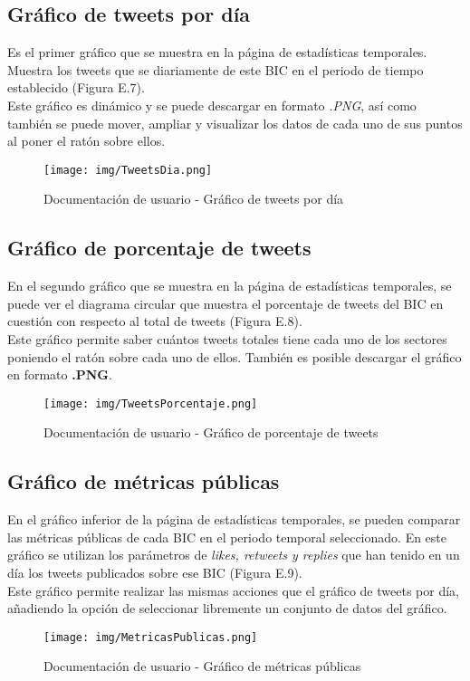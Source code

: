 \subsection{Gráfico de tweets por día}
Es el primer gráfico que se muestra en la página de estadísticas temporales. Muestra los tweets que se diariamente de este BIC en el periodo de tiempo establecido (Figura E.7).\\
Este gráfico es dinámico y se puede descargar en formato \textit{.PNG}, así como también se puede mover, ampliar y visualizar los datos de cada uno de sus puntos al poner el ratón sobre ellos.
\begin{figure}[h!]
    \centering
    \texttt{[image: img/TweetsDia.png]} \\
    \caption{Documentación de usuario - Gráfico de tweets por día}
    \label{Documentación de usuario - Gráfico de tweets por día}
\end{figure}
\subsection{Gráfico de porcentaje de tweets}
En el segundo gráfico que se muestra en la página de estadísticas temporales, se puede ver el diagrama circular que muestra el porcentaje de tweets del BIC en cuestión con respecto al total de tweets (Figura E.8).\\
Este gráfico permite saber cuántos tweets totales tiene cada uno de los sectores poniendo el ratón sobre cada uno de ellos. También es posible descargar el gráfico en formato \textbf{.PNG}.\\
\begin{figure}[h!]
    \centering
    \texttt{[image: img/TweetsPorcentaje.png]} \\
    \caption{Documentación de usuario - Gráfico de porcentaje de tweets}
    \label{Documentación de usuario - Gráfico de porcentaje de tweets}
\end{figure}
\subsection{Gráfico de métricas públicas}
En el gráfico inferior de la página de estadísticas temporales, se pueden comparar las métricas públicas de cada BIC en el periodo temporal seleccionado. En este gráfico se utilizan los parámetros de \textit{likes, retweets y replies} que han tenido en un día los tweets publicados sobre ese BIC (Figura E.9).\\
Este gráfico permite realizar las mismas acciones que el gráfico de tweets por día, añadiendo la opción de seleccionar libremente un conjunto de datos del gráfico.
\begin{figure}[h!]
    \centering
    \texttt{[image: img/MetricasPublicas.png]} \\
    \caption{Documentación de usuario - Gráfico de métricas públicas}
    \label{Documentación de usuario - Gráfico de métricas públicas}
\end{figure}


